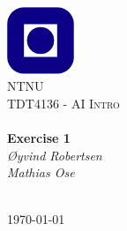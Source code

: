 \begin{titlepage}
\begin{center}
\includegraphics[width=0.15\textwidth]{img/NTNU.png}~\\[1cm]

\textsc{\LARGE NTNU}\\[1.5cm]

\textsc{\Large TDT4136 - AI Intro}\\[0.5cm]

\HRule \\[0.4cm]
{ \huge \bfseries Exercise 1}\\[0.5cm]
{\large \textit{Øyvind Robertsen\\Mathias Ose}}\\[0.2cm]
\HRule \\[1.5cm]



\vfill

{\large \today}
\end{center}
\end{titlepage}
